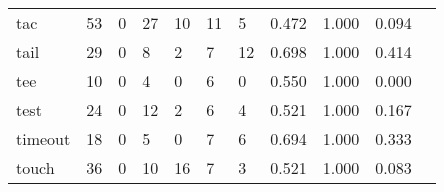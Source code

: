 \begin{longtable}{lp{1.2cm}p{1.2cm}p{1.2cm}p{1.2cm}p{1.2cm}p{1.2cm}p{1.2cm}p{1.2cm}p{1.2cm}p{1.2cm}}
tac       &                                    53 &                                                  0 &                                                 27 &                                                 10 &                                                 11 &                                                  5 &                                              0.472 &                                              1.000 &                                              0.094 \\
tail      &                                    29 &                                                  0 &                                                  8 &                                                  2 &                                                  7 &                                                 12 &                                              0.698 &                                              1.000 &                                              0.414 \\
tee       &                                    10 &                                                  0 &                                                  4 &                                                  0 &                                                  6 &                                                  0 &                                              0.550 &                                              1.000 &                                              0.000 \\
test      &                                    24 &                                                  0 &                                                 12 &                                                  2 &                                                  6 &                                                  4 &                                              0.521 &                                              1.000 &                                              0.167 \\
timeout   &                                    18 &                                                  0 &                                                  5 &                                                  0 &                                                  7 &                                                  6 &                                              0.694 &                                              1.000 &                                              0.333 \\
touch     &                                    36 &                                                  0 &                                                 10 &                                                 16 &                                                  7 &                                                  3 &                                              0.521 &                                              1.000 &                                              0.083 \\

\end{longtable}
